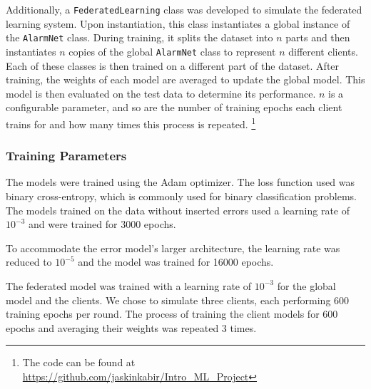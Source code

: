 \documentclass[conference]{IEEEtran}
\begin{document}
Additionally, a \texttt{FederatedLearning} class was
developed to simulate the federated learning system. Upon
instantiation, this class instantiates a global instance of
the \texttt{AlarmNet} class. During training, it splits the
dataset into $n$ parts and then instantiates $n$ copies of
the global \texttt{AlarmNet} class to represent $n$
different clients. Each of these classes is then trained on
a different part of the dataset. After training, the weights
of each model are  averaged to update the global model. This
model is then evaluated on the test data to determine its
performance. $n$ is a configurable parameter, and so are the
number of training epochs each client trains for and how
many times this process is repeated.
\footnote{The code can be found at \url{https://github.com/jaskinkabir/Intro_ML_Project}}

\subsubsection{Training Parameters}
The models were trained using the Adam optimizer. The loss function used was binary cross-entropy, which is commonly used for binary classification problems. The models trained on the data without inserted errors used a learning rate of $10^{-3}$ and were trained for 3000 epochs. 

To accommodate the error model's larger architecture, the learning rate was reduced to $10^{-5}$ and the model was trained for 16000 epochs. 

The federated model was trained with a learning rate of $10^{-3}$ for the global model and the clients. We chose to simulate three clients, each performing 600 training epochs per round. The process of training the client models for 600 epochs and averaging their weights was repeated 3 times.
\end{document}

